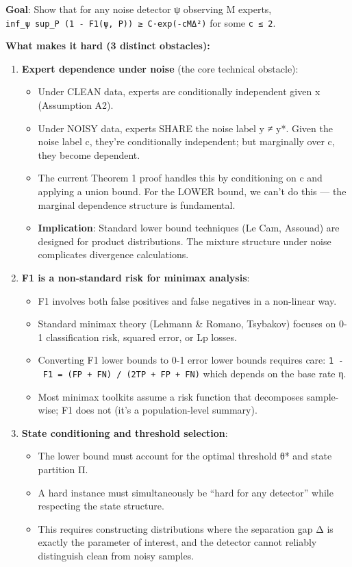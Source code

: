 \documentclass[
  12pt,
]{article}
\providecommand{\tightlist}{%
  \setlength{\itemsep}{0pt}\setlength{\parskip}{0pt}}
\begin{document}
\textbf{Goal}: Show that for any noise detector ψ observing M experts,
\texttt{inf\_ψ\ sup\_P\ (1\ -\ F1(ψ,\ P))\ ≥\ C·exp(-cMΔ²)} for some
\texttt{c\ ≤\ 2}.

\textbf{What makes it hard (3 distinct obstacles):}

\begin{enumerate}
\def\labelenumi{\arabic{enumi}.}
\tightlist
\item
  \textbf{Expert dependence under noise} (the core technical obstacle):

  \begin{itemize}
  \tightlist
  \item
    Under CLEAN data, experts are conditionally independent given x
    (Assumption A2).
  \item
    Under NOISY data, experts SHARE the noise label y ≠ y*. Given the
    noise label c, they're conditionally independent; but marginally
    over c, they become dependent.
  \item
    The current Theorem 1 proof handles this by conditioning on c and
    applying a union bound. For the LOWER bound, we can't do this ---
    the marginal dependence structure is fundamental.
  \item
    \textbf{Implication}: Standard lower bound techniques (Le Cam,
    Assouad) are designed for product distributions. The mixture
    structure under noise complicates divergence calculations.
  \end{itemize}
\item
  \textbf{F1 is a non-standard risk for minimax analysis}:

  \begin{itemize}
  \tightlist
  \item
    F1 involves both false positives and false negatives in a non-linear
    way.
  \item
    Standard minimax theory (Lehmann \& Romano, Tsybakov) focuses on 0-1
    classification risk, squared error, or Lp losses.
  \item
    Converting F1 lower bounds to 0-1 error lower bounds requires care:
    \texttt{1\ -\ F1\ =\ (FP\ +\ FN)\ /\ (2TP\ +\ FP\ +\ FN)} which
    depends on the base rate η.
  \item
    Most minimax toolkits assume a risk function that decomposes
    sample-wise; F1 does not (it's a population-level summary).
  \end{itemize}
\item
  \textbf{State conditioning and threshold selection}:

  \begin{itemize}
  \tightlist
  \item
    The lower bound must account for the optimal threshold θ* and state
    partition Π.
  \item
    A hard instance must simultaneously be ``hard for any detector''
    while respecting the state structure.
  \item
    This requires constructing distributions where the separation gap Δ
    is exactly the parameter of interest, and the detector cannot
    reliably distinguish clean from noisy samples.
  \end{itemize}
\end{enumerate}
\end{document}
